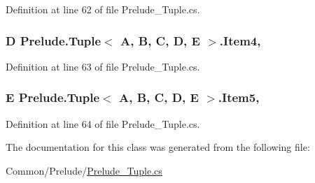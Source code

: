 Definition at line 62 of file Prelude\+\_\+\+Tuple.\+cs.

\hypertarget{class_prelude_1_1_tuple_3_01_a_00_01_b_00_01_c_00_01_d_00_01_e_01_4_a9a501da5e5aff665079cff9283a58c5c}{
\subsubsection[{Item4}]{\setlength{\rightskip}{0pt plus 5cm}D Prelude.\+Tuple$<$ A, B, C, D, E $>$.Item4\hspace{0.3cm}{\ttfamily [get]}, {\ttfamily [set]}}}\label{class_prelude_1_1_tuple_3_01_a_00_01_b_00_01_c_00_01_d_00_01_e_01_4_a9a501da5e5aff665079cff9283a58c5c}


Definition at line 63 of file Prelude\+\_\+\+Tuple.\+cs.

\hypertarget{class_prelude_1_1_tuple_3_01_a_00_01_b_00_01_c_00_01_d_00_01_e_01_4_a3e2da27dd432de7c0e55306ba856b5e2}{
\subsubsection[{Item5}]{\setlength{\rightskip}{0pt plus 5cm}E Prelude.\+Tuple$<$ A, B, C, D, E $>$.Item5\hspace{0.3cm}{\ttfamily [get]}, {\ttfamily [set]}}}\label{class_prelude_1_1_tuple_3_01_a_00_01_b_00_01_c_00_01_d_00_01_e_01_4_a3e2da27dd432de7c0e55306ba856b5e2}


Definition at line 64 of file Prelude\+\_\+\+Tuple.\+cs.



The documentation for this class was generated from the following file\+:\begin{DoxyCompactItemize}
\item 
Common/\+Prelude/\hyperlink{_prelude___tuple_8cs}{Prelude\+\_\+\+Tuple.\+cs}\end{DoxyCompactItemize}
